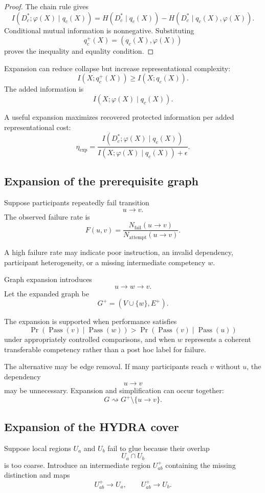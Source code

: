 \documentclass[11pt]{article}
\theoremstyle{definition}
\DeclareMathOperator{\Prob}{Pr}
\begin{document}
\begin{proof}
The chain rule gives
\[
I(D_c^{*};\varphi(X)\mid q_c(X))
=
H(D_c^{*}\mid q_c(X))
-
H(D_c^{*}\mid q_c(X),\varphi(X)).
\]
Conditional mutual information is nonnegative. Substituting
\[
q_c^{+}(X)
=
(q_c(X),\varphi(X))
\]
proves the inequality and equality condition.
\end{proof}

Expansion can reduce collapse but increase representational complexity:
\[
I(X;q_c^{+}(X))
\geq
I(X;q_c(X)).
\]
The added information is
\[
I(X;\varphi(X)\mid q_c(X)).
\]

A useful expansion maximizes recovered protected information per added representational cost:
\[
\eta_{\mathrm{exp}}
=
\frac{
I(D_c^{*};\varphi(X)\mid q_c(X))
}{
I(X;\varphi(X)\mid q_c(X))+\epsilon
}.
\]

\subsection{Expansion of the prerequisite graph}

Suppose participants repeatedly fail transition
\[
u\to v.
\]
The observed failure rate is
\[
F(u,v)
=
\frac{
N_{\mathrm{fail}}(u\to v)
}{
N_{\mathrm{attempt}}(u\to v)
}.
\]

A high failure rate may indicate poor instruction, an invalid dependency, participant heterogeneity, or a missing intermediate competency \(w\).

Graph expansion introduces
\[
u\to w\to v.
\]
Let the expanded graph be
\[
G^{+}
=
(V\cup\{w\},E^{+}).
\]

The expansion is supported when performance satisfies
\[
\Prob(\operatorname{Pass}(v)\mid\operatorname{Pass}(w))
>
\Prob(\operatorname{Pass}(v)\mid\operatorname{Pass}(u))
\]
under appropriately controlled comparisons, and when \(w\) represents a coherent transferable competency rather than a post hoc label for failure.

The alternative may be edge removal. If many participants reach \(v\) without \(u\), the dependency
\[
u\to v
\]
may be unnecessary. Expansion and simplification can occur together:
\[
G
\rightsquigarrow
G^{+}
\setminus\{u\to v\}.
\]

\subsection{Expansion of the HYDRA cover}

Suppose local regions \(U_a\) and \(U_b\) fail to glue because their overlap
\[
U_a\cap U_b
\]
is too coarse. Introduce an intermediate region \(U_{ab}^{+}\) containing the missing distinction and maps
\[
U_{ab}^{+}\to U_a,
\qquad
U_{ab}^{+}\to U_b.
\]
\end{document}
